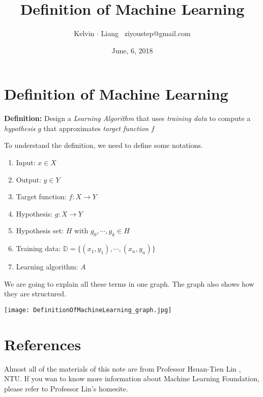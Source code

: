 \documentclass[11pt]{article}
\begin{document}
\title{Definition of Machine Learning}
\author{Kelvin $\cdot$ Liang \, ziyoustep@gmail.com}
\date{June, 6, 2018}
\maketitle

\section{Definition of Machine Learning}
\textbf{Definition: } Design a \emph{Learning Algorithm} that uses \emph{training data} to compute a \emph{hypothesis} $g$ that approximates \emph{target function} $f$

To understand the definition, we need to define some notations.

\begin{enumerate}
\item Input: $x \in X$
\item Output: $y \in Y$
\item Target function: $f: X \to Y$
\item Hypothesis: $g: X \to Y$
\item Hypothesis set: $H$ with $g_0,\cdots, g_k \in H$
\item Training data: $\mathbb{D}=\{(x_1,y_1),\cdots,(x_n,y_n)\}$
\item Learning algorithm: $A$
\end{enumerate}

We are going to explain all these terms in one graph. The graph also shows how they are structured.

\texttt{[image: DefinitionOfMachineLearning\_graph.jpg]}

\section{References}
Almost all of the materials of this note are from Professor Hsuan-Tien Lin , NTU. If you wan to know more information about Machine Learning Foundation, please refer to Professor Lin's homesite.
\end{document}
